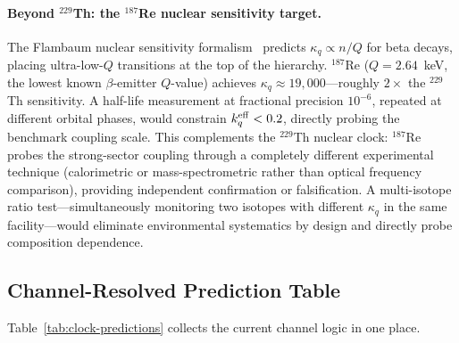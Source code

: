 \paragraph{Beyond $^{229}$Th: the $^{187}$Re nuclear sensitivity target.}
The Flambaum nuclear sensitivity formalism~\cite{Flambaum2006,AlcockNuclearDecay2026} predicts
$\kappa_q \propto n/Q$ for beta decays, placing ultra-low-$Q$ transitions
at the top of the hierarchy.  $^{187}$Re ($Q = 2.64$~keV, the lowest known
$\beta$-emitter $Q$-value) achieves $\kappa_q \approx 19{,}000$---roughly
$2\times$ the $^{229}$Th sensitivity.  A half-life measurement at fractional
precision $10^{-6}$, repeated at different orbital phases, would constrain
$k_q^{\rm eff} < 0.2$, directly probing the benchmark coupling scale.
This complements the $^{229}$Th nuclear clock: $^{187}$Re probes the
strong-sector coupling through a completely different experimental technique
(calorimetric or mass-spectrometric rather than optical frequency comparison),
providing independent confirmation or falsification.
A multi-isotope ratio test---simultaneously monitoring two isotopes with
different $\kappa_q$ in the same facility---would eliminate environmental
systematics by design and directly probe composition dependence.

\subsection{Channel-Resolved Prediction Table}\label{sec:clocks-hierarchy}

Table~\ref{tab:clock-predictions} collects the current channel logic in one place.

